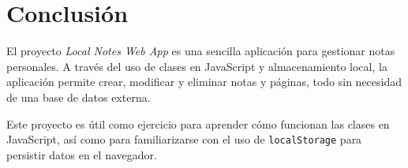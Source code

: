 \documentclass[a4paper,12pt]{report}
\begin{document}
\chapter{Conclusión}

El proyecto \textit{Local Notes Web App} es una sencilla aplicación para gestionar notas personales. A través del uso de clases en JavaScript y almacenamiento local, la aplicación permite crear, modificar y eliminar notas y páginas, todo sin necesidad de una base de datos externa.

Este proyecto es útil como ejercicio para aprender cómo funcionan las clases en JavaScript, así como para familiarizarse con el uso de \texttt{localStorage} para persistir datos en el navegador.
\end{document}
